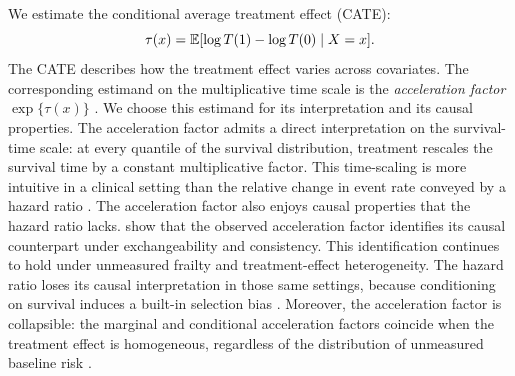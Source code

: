 We estimate the conditional average treatment effect (CATE):
\begin{equation}
\tau(x) = \mathbb{E}[\log T(1) - \log T(0) \mid X = x].
\label{eq:cate}
\end{equation}
The CATE describes how the treatment effect varies across covariates.
The corresponding estimand on the multiplicative time scale is the \emph{acceleration factor} $\exp\{\tau(x)\}$ \citep{pang2021flexible}.
We choose this estimand for its interpretation and its causal properties.
The acceleration factor admits a direct interpretation on the survival-time scale: at every quantile of the survival distribution, treatment rescales the survival time by a constant multiplicative factor.
This time-scaling is more intuitive in a clinical setting than the relative change in event rate conveyed by a hazard ratio \citep{Swindell2009}.
The acceleration factor also enjoys causal properties that the hazard ratio lacks.
\citet{Brathovde2024} show that the observed acceleration factor identifies its causal counterpart under exchangeability and consistency.
This identification continues to hold under unmeasured frailty and treatment-effect heterogeneity.
The hazard ratio loses its causal interpretation in those same settings, because conditioning on survival induces a built-in selection bias \citep{hernan2010}.
Moreover, the acceleration factor is collapsible: the marginal and conditional acceleration factors coincide when the treatment effect is homogeneous, regardless of the distribution of unmeasured baseline risk \citep{Crowther2023}.

